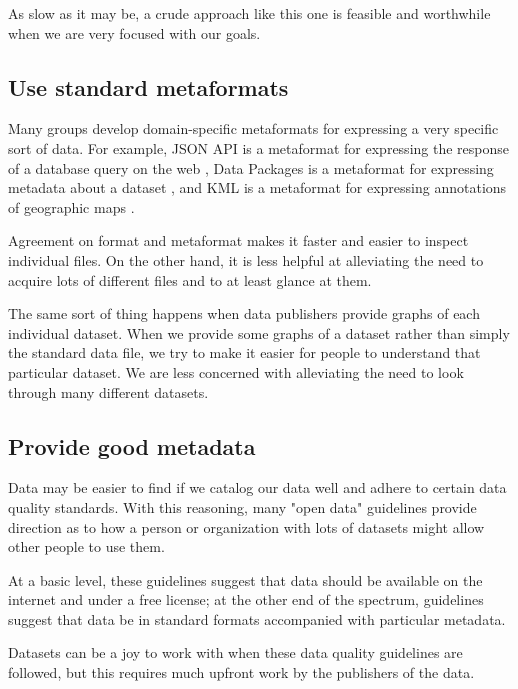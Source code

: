 \documentclass{acm_proc_article-sp}
\begin{document}
As slow as it may be, a crude approach like this one is feasible and
worthwhile when we are very focused with our goals.

\subsection{Use standard metaformats}
Many groups develop domain-specific metaformats for expressing a very specific
sort of data. For example, JSON API is a metaformat for expressing the
response of a database query on the web \cite{jsonapi}, Data Packages is a
metaformat for expressing metadata about a dataset \cite{datapackages},
and KML is a metaformat for expressing annotations of geographic maps \citep{kml}.

Agreement on format and metaformat makes it faster and easier to inspect
individual files. On the other hand, it is less helpful at alleviating the
need to acquire lots of different files and to at least glance at them.

The same sort of thing happens when data publishers provide graphs of
each individual dataset. When we provide some graphs of a dataset
rather than simply the standard data file, we try to make it easier for
people to understand that particular dataset. We are less concerned with
alleviating the need to look through many different datasets.

\subsection{Provide good metadata} \label{guidelines}
Data may be easier to find if we catalog our data well and adhere to
certain data quality standards. With this reasoning,
many "open data" guidelines provide direction as to how a person
or organization with lots of datasets might allow other people
to use them.
\cite{open-data-census,fivestars,sunlight,sebastopol,odi}

At a basic level, these guidelines suggest that data should
be available on the internet and under a free license; at the other
end of the spectrum, guidelines suggest that data be in standard
formats accompanied with particular metadata.

Datasets can be a joy to work with when these data quality guidelines
are followed, but this requires much upfront work by the publishers
of the data.
\end{document}
